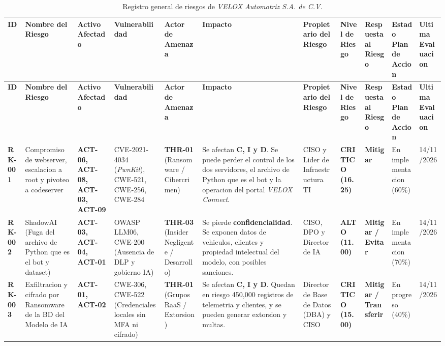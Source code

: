 \documentclass[letterpaper,11pt]{article}
\begin{document}
\begingroup
\tiny
\setlength{\tabcolsep}{2.2pt}
\renewcommand{\arraystretch}{1.35}
\noindent
\begin{longtable}{|C{0.80cm}|L{1.58cm}|L{1.20cm}|L{1.92cm}|L{1.65cm}|L{1.70cm}|L{1.70cm}|C{1.35cm}|C{1.30cm}|C{1.35cm}|C{1.35cm}|}
\caption{Registro general de riesgos de \textit{VELOX Automotriz S.A. de C.V.}}
\label{tab:plantilla-registro-riesgos} \\
\hline
{}
\textbf{ID}
  & \textbf{Nombre del Riesgo}
  & \textbf{Activo Afectado}
  & \textbf{Vulnerabilidad}
  & \textbf{Actor de Amenaza}
  & \textbf{Impacto}
  & \textbf{Propietario del Riesgo}
  & \textbf{Nivel de Riesgo}
  & \textbf{Respuesta al Riesgo}
  & \textbf{Estado Plan de Accion}
  & \textbf{Ultima Evaluacion} \\
\hline
\endfirsthead
\hline
{}
\textbf{ID}
  & \textbf{Nombre del Riesgo}
  & \textbf{Activo Afectado}
  & \textbf{Vulnerabilidad}
  & \textbf{Actor de Amenaza}
  & \textbf{Impacto}
  & \textbf{Propietario del Riesgo}
  & \textbf{Nivel de Riesgo}
  & \textbf{Respuesta al Riesgo}
  & \textbf{Estado Plan de Accion}
  & \textbf{Ultima Evaluacion} \\
\hline
\endhead
\hline
\endlastfoot

\textbf{RK-001}
  & Compromiso de webserver, escalacion a root y pivoteo a codeserver
  & \textbf{ACT-06, ACT-08, ACT-03, ACT-09}
  & CVE-2021-4034 (\textit{PwnKit}), CWE-521, CWE-256, CWE-284
  & \textbf{THR-01} (Ransomware / Cibercrimen)
  & Se afectan \textbf{C, I y D}. Se puede perder el control de los dos
servidores, el archivo de Python que es el bot y la operacion del
portal \textit{VELOX Connect}.
  & CISO y Lider de Infraestructura TI
  & \textbf{CRITICO (16.25)}
  & \textbf{Mitigar}
  & En implementacion (60\%)
  & 14/11/2026 \\
\hline

\textbf{RK-002}
  & ShadowAI (Fuga del archivo de Python que es el bot y dataset)
  & \textbf{ACT-03, ACT-04, ACT-01}
  & OWASP LLM06, CWE-200 (Ausencia de DLP y gobierno IA)
  & \textbf{THR-03} (Insider Negligente / Desarrollo)
  & Se pierde \textbf{confidencialidad}. Se exponen datos de vehiculos,
clientes y propiedad intelectual del modelo, con posibles sanciones.
  & CISO, DPO y Director de IA
  & \textbf{ALTO (11.00)}
  & \textbf{Mitigar / Evitar}
  & En implementacion (70\%)
  & 14/11/2026 \\
\hline

\textbf{RK-003}
  & Exfiltracion y cifrado por Ransomware de la BD del Modelo de IA
  & \textbf{ACT-01, ACT-02}
  & CWE-306, CWE-522 (Credenciales locales sin MFA ni cifrado)
  & \textbf{THR-01} (Grupos RaaS / Extorsion)
  & Se afectan \textbf{C, I y D}. Quedan en riesgo 450,000 registros de
telemetria y clientes, y se pueden generar extorsion y multas.
  & Director de Base de Datos (DBA) y CISO
  & \textbf{CRITICO (15.00)}
  & \textbf{Mitigar / Transferir}
  & En progreso (40\%)
  & 14/11/2026 \\
\hline


\end{longtable}
\end{document}
